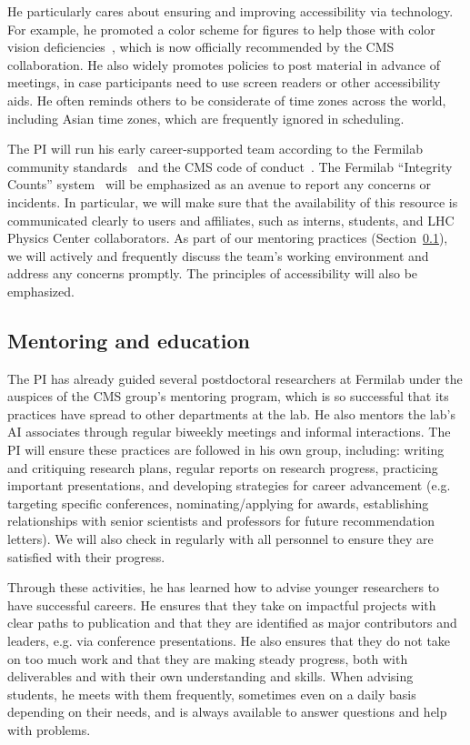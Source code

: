 He particularly cares about ensuring and improving accessibility via technology.
For example, he promoted a color scheme for figures to help those with color vision deficiencies~\cite{Petroff:2021},
which is now officially recommended by the CMS collaboration.
He also widely promotes policies to post material in advance of meetings,
in case participants need to use screen readers or other accessibility aids.
He often reminds others to be considerate of time zones across the world,
including Asian time zones, which are frequently ignored in scheduling.

The PI will run his early career-supported team according to the Fermilab community standards~\cite{CommunityStandards} and the CMS code of conduct~\cite{CodeOfConduct}.
The Fermilab ``Integrity Counts'' system~\cite{ConcernsReporting} will be emphasized as an avenue to report any concerns or incidents.
In particular, we will make sure that the availability of this resource is communicated clearly
to users and affiliates, such as interns, students, and LHC Physics Center collaborators.
As part of our mentoring practices (Section~\ref{subsec:mentor}),
we will actively and frequently discuss the team's working environment and address any concerns promptly.
The principles of accessibility will also be emphasized.

\subsection{Mentoring and education}\label{subsec:mentor}

The PI has already guided several postdoctoral researchers at Fermilab
under the auspices of the CMS group's mentoring program,
which is so successful that its practices have spread to other departments at the lab.
He also mentors the lab's AI associates through regular biweekly meetings and informal interactions.
The PI will ensure these practices are followed in his own group, including:
writing and critiquing research plans, regular reports on research progress, practicing important presentations,
and developing strategies for career advancement (e.g. targeting specific conferences, nominating/applying for awards,
establishing relationships with senior scientists and professors for future recommendation letters).
We will also check in regularly with all personnel to ensure they are satisfied with their progress.

Through these activities, he has learned how to advise younger researchers to have successful careers.
He ensures that they take on impactful projects with clear paths to publication
and that they are identified as major contributors and leaders, e.g. via conference presentations.
He also ensures that they do not take on too much work and that they are making steady progress,
both with deliverables and with their own understanding and skills.
When advising students, he meets with them frequently, sometimes even on a daily basis depending on their needs,
and is always available to answer questions and help with problems.

